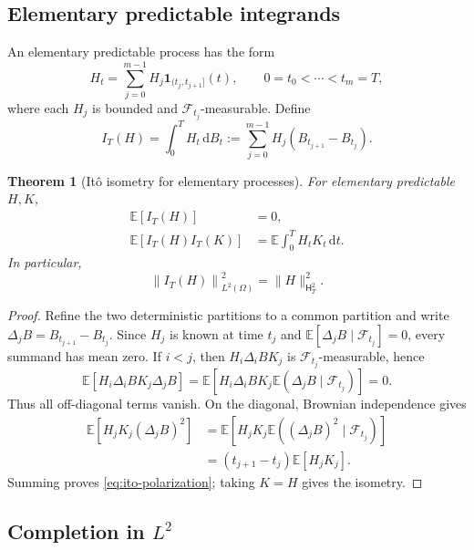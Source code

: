 \documentclass[10pt,a4paper]{article}
\numberwithin{equation}{section}
\theoremstyle{blueplain}
\newtheorem{theorem}{Theorem}[section]
\theoremstyle{definition}
\newcommand{\E}{\mathbb E}
\newcommand{\F}{\mathcal F}
\newcommand{\dd}{\,\mathrm d}
\newcommand{\ind}{\mathbf 1}
\begin{document}
\subsection{Elementary predictable integrands}

An elementary predictable process has the form
\begin{equation}
  H_t=\sum_{j=0}^{m-1}H_j\ind_{(t_j,t_{j+1}]}(t),
  \qquad
  0=t_0<\cdots<t_m=T,
  \label{eq:elementary-predictable}
\end{equation}
where each \(H_j\) is bounded and \(\F_{t_j}\)-measurable.  Define
\begin{equation}
  I_T(H)=\int_0^T H_t\dd B_t
  :=\sum_{j=0}^{m-1}H_j(B_{t_{j+1}}-B_{t_j}).
  \label{eq:elementary-ito-integral}
\end{equation}

\begin{theorem}[It\^o isometry for elementary processes]
For elementary predictable \(H,K\),
\begin{align}
  \E[I_T(H)]&=0,
  \label{eq:ito-mean-zero}\\
  \E[I_T(H)I_T(K)]
  &=\E\int_0^T H_tK_t\dd t.
  \label{eq:ito-polarization}
\end{align}
In particular,
\begin{equation}
  \left\|I_T(H)\right\|_{L^2(\Omega)}^2
  =\|H\|_{\mathsf H_T^2}^2.
  \label{eq:ito-isometry}
\end{equation}
\end{theorem}

\begin{proof}
Refine the two deterministic partitions to a common partition and write
\(\Delta_jB=B_{t_{j+1}}-B_{t_j}\).  Since \(H_j\) is known at time \(t_j\)
and \(\E[\Delta_jB\mid\F_{t_j}]=0\), every summand has mean zero.  If
\(i<j\), then \(H_i\Delta_iB K_j\) is \(\F_{t_j}\)-measurable, hence
\[
 \E[H_i\Delta_iB K_j\Delta_jB]
 =\E\!\left[H_i\Delta_iB K_j
   \E(\Delta_jB\mid\F_{t_j})\right]=0.
\]
Thus all off-diagonal terms vanish.  On the diagonal, Brownian independence
gives
\begin{align*}
 \E[H_jK_j(\Delta_jB)^2]
 &=\E\!\left[H_jK_j
   \E((\Delta_jB)^2\mid\F_{t_j})\right]\\
 &=(t_{j+1}-t_j)\E[H_jK_j].
\end{align*}
Summing proves \eqref{eq:ito-polarization}; taking \(K=H\) gives the
isometry.
\end{proof}

\subsection{Completion in \texorpdfstring{$L^2$}{L2}}
\end{document}
